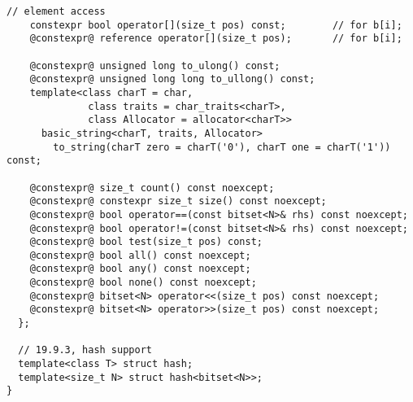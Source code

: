 \documentclass[ebook,11pt,article,a4paper]{memoir}
\begin{document}
\begin{lstlisting}[style=cppdiff]
    // element access
    constexpr bool operator[](size_t pos) const;        // for b[i];
    @constexpr@ reference operator[](size_t pos);       // for b[i];

    @constexpr@ unsigned long to_ulong() const;
    @constexpr@ unsigned long long to_ullong() const;
    template<class charT = char,
              class traits = char_traits<charT>,
              class Allocator = allocator<charT>>
      basic_string<charT, traits, Allocator>
        to_string(charT zero = charT('0'), charT one = charT('1')) const;

    @constexpr@ size_t count() const noexcept;
    @constexpr@ constexpr size_t size() const noexcept;
    @constexpr@ bool operator==(const bitset<N>& rhs) const noexcept;
    @constexpr@ bool operator!=(const bitset<N>& rhs) const noexcept;
    @constexpr@ bool test(size_t pos) const;
    @constexpr@ bool all() const noexcept;
    @constexpr@ bool any() const noexcept;
    @constexpr@ bool none() const noexcept;
    @constexpr@ bitset<N> operator<<(size_t pos) const noexcept;
    @constexpr@ bitset<N> operator>>(size_t pos) const noexcept;
  };

  // 19.9.3, hash support
  template<class T> struct hash;
  template<size_t N> struct hash<bitset<N>>;
}
\end{lstlisting}
\end{document}
